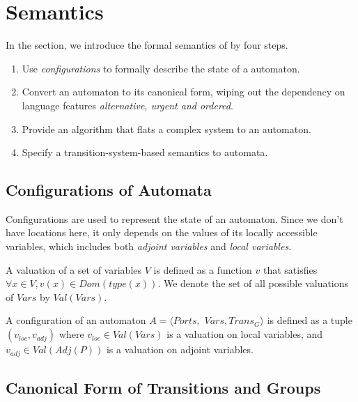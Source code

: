 \section{Semantics}
\label{sec:semantics}

In the section, we introduce the formal semantics of \lang{} by four steps.
\begin{enumerate}
    \item Use \emph{configurations} to formally describe the state of a automaton.
    \item Convert an automaton to its canonical form, wiping out the dependency on language features \emph{alternative, urgent and ordered}.
    \item Provide an algorithm that flats a complex system to an automaton.
    \item Specify a transition-system-based semantics to \lang{} automata.
\end{enumerate}


\subsection{Configurations of Automata}
\label{subsec:config}
Configurations are used to represent the state of an automaton. Since we don't have locations here, it only depends on the values of its locally accessible variables, which includes both \emph{adjoint variables} and \emph{local variables}.

\begin{definition}[Valuation]
A valuation of a set of variables $V$ is defined as a function $v$ that satisfies $\forall x\in V,v(x)\in Dom(type(x))$. We denote the set of all possible valuations of $Vars$ by $Val(Vars)$.
\end{definition}

\begin{definition}[Configuration] A configuration of an automaton $A=\langle Ports,$ $Vars,Trans_G\rangle$ is defined as a tuple $(v_{loc},v_{adj})$ where $v_{loc}\in Val(Vars)$ is a valuation on local variables, and $v_{adj}\in Val(Adj(P))$ is a valuation on adjoint variables. 
\end{definition}

\subsection{Canonical Form of Transitions and Groups}
\label{subsec:canonical}

